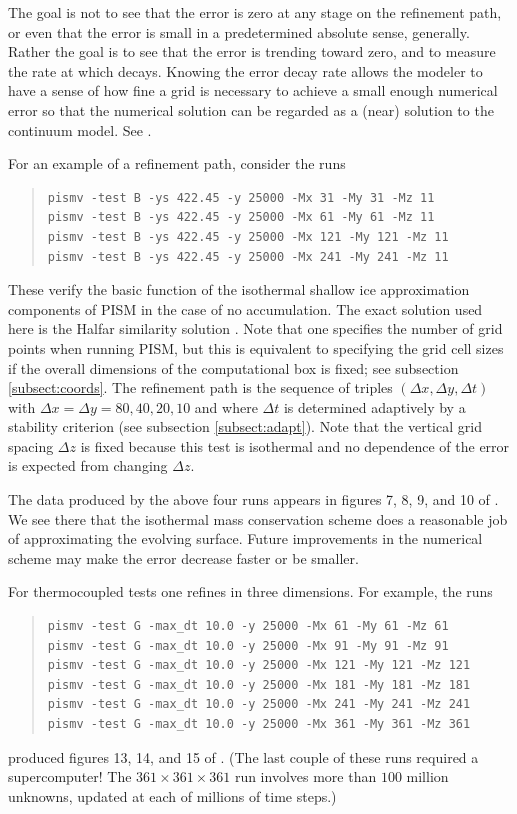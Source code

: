 \documentclass[11pt,final]{amsart}
\begin{document}
The goal is not to see that the error is zero at any stage on the refinement path, or even that the error is small in a predetermined absolute sense, generally.  Rather the goal is to see that the error is trending toward zero, and to measure the rate at which decays.  Knowing the error decay rate allows the modeler to have a sense of how fine a grid is necessary to achieve a small enough numerical error so that the numerical solution can be regarded as a (near) solution to the continuum model.  See \cite{BLKCB,BBL,Roache,Wesseling}.

For an example of a refinement path, consider the runs
\begin{quote}\small\begin{verbatim}
pismv -test B -ys 422.45 -y 25000 -Mx 31 -My 31 -Mz 11
pismv -test B -ys 422.45 -y 25000 -Mx 61 -My 61 -Mz 11
pismv -test B -ys 422.45 -y 25000 -Mx 121 -My 121 -Mz 11
pismv -test B -ys 422.45 -y 25000 -Mx 241 -My 241 -Mz 11
\end{verbatim}
\normalsize\end{quote}
These verify the basic function of the isothermal shallow ice approximation components of PISM in the case of no accumulation.  The exact solution used here is the Halfar similarity solution \cite{Halfar83}.  Note that one specifies the number of grid points when running PISM, but this is equivalent to specifying the grid cell sizes if the overall dimensions of the computational box is fixed; see subsection \ref{subsect:coords}.  The refinement path is the sequence of triples $(\Delta x,\Delta y,\Delta t)$ with $\Delta x = \Delta y = 80,40,20,10$ and where $\Delta t$ is determined adaptively by a stability criterion (see subsection \ref{subsect:adapt}).  Note that the vertical grid spacing $\Delta z$ is fixed because this test is isothermal and no dependence of the error is expected from changing $\Delta z$.

The data produced by the above four runs appears in figures 7, 8, 9, and 10 of \cite{BLKCB}.  We see there that the isothermal mass conservation scheme does a reasonable job of approximating the evolving surface.  Future improvements in the numerical scheme may make the error decrease faster or be smaller.

For thermocoupled tests one refines in three dimensions.  For example, the runs
\begin{quote}\small\begin{verbatim}
pismv -test G -max_dt 10.0 -y 25000 -Mx 61 -My 61 -Mz 61
pismv -test G -max_dt 10.0 -y 25000 -Mx 91 -My 91 -Mz 91
pismv -test G -max_dt 10.0 -y 25000 -Mx 121 -My 121 -Mz 121
pismv -test G -max_dt 10.0 -y 25000 -Mx 181 -My 181 -Mz 181
pismv -test G -max_dt 10.0 -y 25000 -Mx 241 -My 241 -Mz 241
pismv -test G -max_dt 10.0 -y 25000 -Mx 361 -My 361 -Mz 361
\end{verbatim}
\normalsize\end{quote}
produced figures 13, 14, and 15 of \cite{BBL}.  (The last couple of these runs required a supercomputer!  The $361\times 361\times 361$ run involves more than $100$ million unknowns, updated at each of millions of time steps.)
\end{document}

